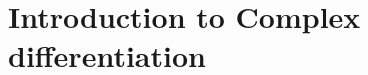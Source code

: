 \documentclass[a4paper, openany]{memoir}
\theoremstyle{definition}
\theoremstyle{plain}
\begin{document}

\newpage

\section{Introduction to Complex differentiation}
\end{document}
